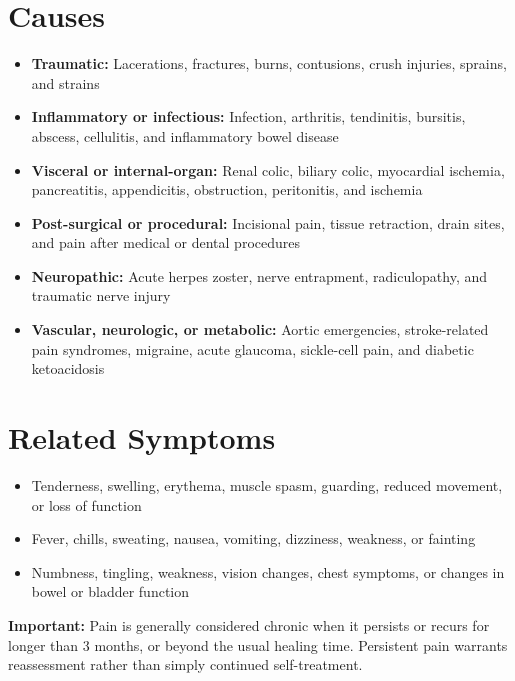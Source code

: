 \section*{Causes}
\begin{itemize}
 \item \textbf{Traumatic:} Lacerations, fractures, burns, contusions, crush injuries, sprains, and strains
 \item \textbf{Inflammatory or infectious:} Infection, arthritis, tendinitis, bursitis, abscess, cellulitis, and inflammatory bowel disease
 \item \textbf{Visceral or internal-organ:} Renal colic, biliary colic, myocardial ischemia, pancreatitis, appendicitis, obstruction, peritonitis, and ischemia
 \item \textbf{Post-surgical or procedural:} Incisional pain, tissue retraction, drain sites, and pain after medical or dental procedures
 \item \textbf{Neuropathic:} Acute herpes zoster, nerve entrapment, radiculopathy, and traumatic nerve injury
 \item \textbf{Vascular, neurologic, or metabolic:} Aortic emergencies, stroke-related pain syndromes, migraine, acute glaucoma, sickle-cell pain, and diabetic ketoacidosis
\end{itemize}

\section*{Related Symptoms}
\begin{itemize}
 \item Tenderness, swelling, erythema, muscle spasm, guarding, reduced movement, or loss of function
 \item Fever, chills, sweating, nausea, vomiting, dizziness, weakness, or fainting
 \item Numbness, tingling, weakness, vision changes, chest symptoms, or changes in bowel or bladder function
\end{itemize}
\textbf{Important:} Pain is generally considered chronic when it persists or recurs for longer than 3 months, or beyond the usual healing time. Persistent pain warrants reassessment rather than simply continued self-treatment.

